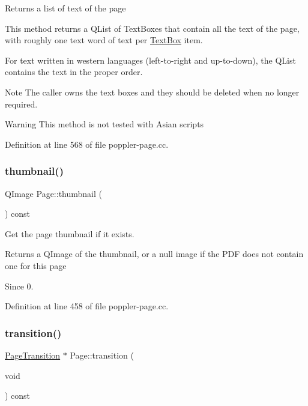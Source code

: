 Returns a list of text of the page

This method returns a Q\+List of Text\+Boxes that contain all the text of the page, with roughly one text word of text per \hyperlink{class_poppler_1_1_text_box}{Text\+Box} item.

For text written in western languages (left-\/to-\/right and up-\/to-\/down), the Q\+List contains the text in the proper order.

\begin{DoxyNote}{Note}
The caller owns the text boxes and they should be deleted when no longer required.
\end{DoxyNote}
\begin{DoxyWarning}{Warning}
This method is not tested with Asian scripts 
\end{DoxyWarning}


Definition at line 568 of file poppler-\/page.\+cc.

\mbox{\label{class_poppler_1_1_page_a151c6caf7c0699f776108d2800b33ece}} 
\subsubsection{\texorpdfstring{thumbnail()}{thumbnail()}}
{\footnotesize\ttfamily Q\+Image Page\+::thumbnail (\begin{DoxyParamCaption}{ }\end{DoxyParamCaption}) const}

Get the page thumbnail if it exists.

\begin{DoxyReturn}{Returns}
a Q\+Image of the thumbnail, or a null image if the P\+DF does not contain one for this page
\end{DoxyReturn}
\begin{DoxySince}{Since}
0. 
\end{DoxySince}


Definition at line 458 of file poppler-\/page.\+cc.

\mbox{\label{class_poppler_1_1_page_aff7331566a9cbf659f625f73ee05f746}} 
\subsubsection{\texorpdfstring{transition()}{transition()}}
{\footnotesize\ttfamily \hyperlink{class_poppler_1_1_page_transition}{Page\+Transition} $\ast$ Page\+::transition (\begin{DoxyParamCaption}\item[{void}]{ }\end{DoxyParamCaption}) const}

